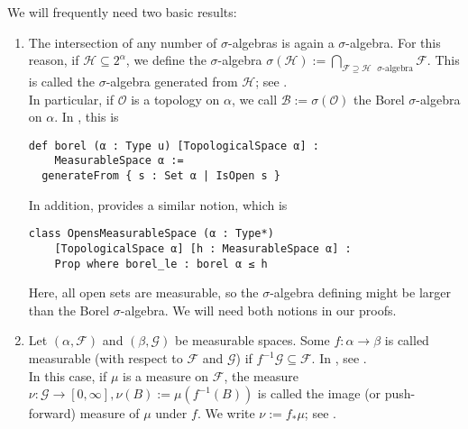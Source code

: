 \documentclass[lean]{DraftAFM}
\begin{document}
\begin{remark}
  We will frequently need two basic results:
  \begin{enumerate}
  \item The intersection of any number of $\sigma$-algebras is again a
    $\sigma$-algebra. For this reason, if $\mathcal H \subseteq
    2^\alpha$, we define the $\sigma$-algebra $\sigma(\mathcal H) :=
    \bigcap_{\mathcal F \supseteq \mathcal H \text{ $\sigma$-algebra}}
    \mathcal F$. This is called the $\sigma$-algebra generated from
    $\mathcal H$; see .  \\ In
    particular, if $\mathcal O$ is a topology on $\alpha$, we call
    $\mathcal B := \sigma(\mathcal O)$ the Borel $\sigma$-algebra on
    $\alpha$. In , this is
\begin{verbatim}
def borel (α : Type u) [TopologicalSpace α] :
    MeasurableSpace α :=
  generateFrom { s : Set α | IsOpen s }
\end{verbatim}
    In addition,  provides a similar notion, which is
\begin{verbatim}
class OpensMeasurableSpace (α : Type*)
    [TopologicalSpace α] [h : MeasurableSpace α] :
    Prop where borel_le : borel α ≤ h
\end{verbatim}
    Here, all open sets are measurable, so the $\sigma$-algebra defining
     might be larger than the Borel $\sigma$-algebra. We will
    need both notions in our proofs.
  \item Let $(\alpha, \mathcal F)$ and $(\beta, \mathcal G)$ be
    measurable spaces. Some $f : \alpha \to \beta$ is called
    measurable (with respect to $\mathcal F$ and $\mathcal G$) if
    $f^{-1} \mathcal G \subseteq \mathcal F$. In ,
    see .
    \\ In this
    case, if $\mu$ is a measure on $\mathcal F$, the measure $\nu:
    \mathcal G \to [0, \infty], \nu(B) := \mu (f^{-1}(B))$ is called
    the image (or push-forward) measure of $\mu$ under $f$. We write
    $\nu := f_\ast \mu$; see .
  \end{enumerate}
\end{remark}
\end{document}
